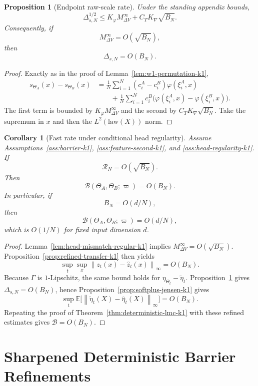 \documentclass[11pt]{article}
\newtheorem{proposition}[theorem]{Proposition}
\newtheorem{corollary}[theorem]{Corollary}
\theoremstyle{definition}
\newcommand{\E}{\mathbb{E}}
\newcommand{\norm}[1]{\left\lVert #1 \right\rVert}
\newcommand{\mc}[1]{\mathcal{#1}}
\newcommand{\cB}{\mathcal{B}}
\begin{document}
\begin{proposition}[Endpoint raw-scale rate]
\label{prop:scale-rate-k1}
Under the standing appendix bounds,
\begin{equation}
  \Delta_{s,N}^{1/2}
  \le
  K_\varphi M_{\Delta V}^\infty + C_TK_{\nabla}\sqrt{B_N}.
  \label{eq:scale-rate-k1}
\end{equation}
Consequently, if
\[
  M_{\Delta V}^\infty=O(\sqrt{B_N}),
\]
then
\[
  \Delta_{s,N}=O(B_N).
\]
\end{proposition}

\begin{proof}
Exactly as in the proof of Lemma~\ref{lem:w1-permutation-k1},
\begin{align*}
  s_{\Theta_A}(x)-s_{\Theta_B}(x)
  &=
  \frac1N\sum_{i=1}^N
  (c_i^A-c_i^B)\varphi(\xi_i^A,x)
  \\
  &\qquad
  +
  \frac1N\sum_{i=1}^N
  c_i^B\bigl(\varphi(\xi_i^A,x)-\varphi(\xi_i^B,x)\bigr).
\end{align*}
The first term is bounded by $K_\varphi M_{\Delta V}^\infty$ and the second by
$C_TK_{\nabla}\sqrt{B_N}$. Take the supremum in $x$ and then the
$L^2(\mathrm{law}(X))$ norm.
\end{proof}

\begin{corollary}[Fast rate under conditional head regularity]
\label{cor:fast-rate-k1}
Assume Assumptions~\ref{ass:barrier-k1}, \ref{ass:feature-second-k1}, and
\ref{ass:head-regularity-k1}. If
\[
  \mc{R}_N=O(\sqrt{B_N}).
\]
Then
\[
  \cB(\Theta_A,\Theta_B;\varpi)=O(B_N).
\]
In particular, if
\[
  B_N=O(d/N),
\]
then
\[
  \cB(\Theta_A,\Theta_B;\varpi)=O(d/N),
\]
which is $O(1/N)$ for fixed input dimension $d$.
\end{corollary}

\begin{proof}
Lemma~\ref{lem:head-mismatch-regular-k1} implies
$M_{\Delta V}^\infty=O(\sqrt{B_N})$. Proposition~\ref{prop:refined-transfer-k1}
then yields
\[
  \sup_t\sup_x \norm{z_t(x)-\hat z_t(x)}_\infty = O(B_N).
\]
Because $\Gamma$ is $1$-Lipschitz, the same bound holds for
$\eta_{\Theta_t}-\tilde\eta_t$. Proposition~\ref{prop:scale-rate-k1} gives
$\Delta_{s,N}=O(B_N)$, hence Proposition~\ref{prop:softplus-jensen-k1} gives
\[
  \sup_t \E\big[\norm{\tilde\eta_t(X)-\hat\eta_t(X)}_\infty\big]=O(B_N).
\]
Repeating the proof of Theorem~\ref{thm:deterministic-lmc-k1} with these
refined estimates gives $\cB=O(B_N)$.
\end{proof}

\section{Sharpened Deterministic Barrier Refinements}
\end{document}

